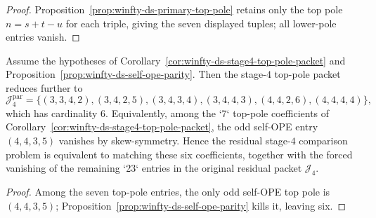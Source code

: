 \begin{proof}
Proposition~\ref{prop:winfty-ds-primary-top-pole} retains only the top pole $n=s+t-u$ for each triple, giving the seven displayed tuples; all lower-pole entries vanish.
\end{proof}

\begin{corollary}
\label{cor:winfty-ds-stage4-parity-packet}
Assume the hypotheses of
Corollary~\ref{cor:winfty-ds-stage4-top-pole-packet} and
Proposition~\ref{prop:winfty-ds-self-ope-parity}.  Then the stage-$4$
top-pole packet reduces further to
\[
\mathcal{J}_4^{\mathrm{par}}
=\{(3,3,4,2),(3,4,2,5),(3,4,3,4),(3,4,4,3),
(4,4,2,6),(4,4,4,4)\},
\]
which has cardinality $6$.  Equivalently, among the `7` top-pole
coefficients of
Corollary~\ref{cor:winfty-ds-stage4-top-pole-packet}, the odd self-OPE
entry $(4,4,3,5)$ vanishes by skew-symmetry.  Hence the residual
stage-$4$ comparison problem is equivalent to matching these six
coefficients, together with the forced vanishing of the remaining `23`
entries in the original residual packet $\mathcal{J}_4$.
\end{corollary}

\begin{proof}
Among the seven top-pole entries, the only odd self-OPE top pole is $(4,4,3,5)$; Proposition~\ref{prop:winfty-ds-self-ope-parity} kills it, leaving six.
\end{proof}

